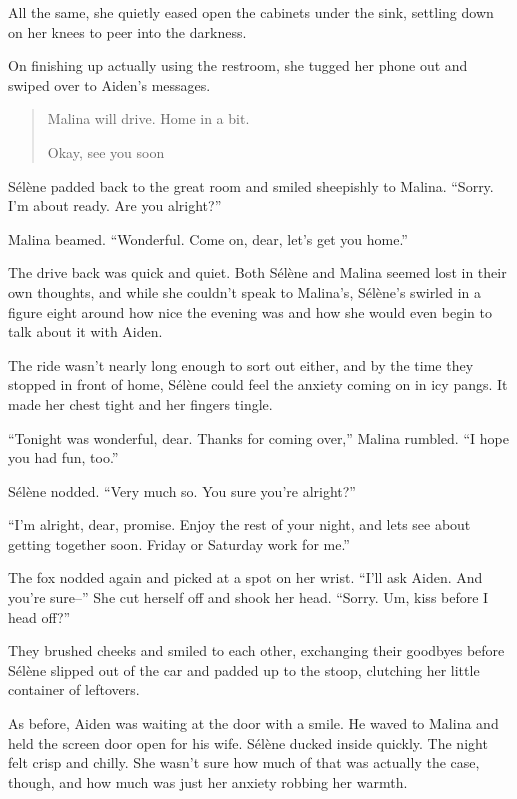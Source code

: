 All the same, she quietly eased open the cabinets under the sink, settling down on her knees to peer into the darkness.

On finishing up actually using the restroom, she tugged her phone out and swiped over to Aiden's messages.

\begin{quote}
 Malina will drive. Home in a bit.

 Okay, see you soon
\end{quote}

Sélène padded back to the great room and smiled sheepishly to Malina. ``Sorry. I'm about ready. Are you alright?''

Malina beamed. ``Wonderful. Come on, dear, let's get you home.''

\secdiv{}

\noindent The drive back was quick and quiet. Both Sélène and Malina seemed lost in their own thoughts, and while she couldn't speak to Malina's, Sélène's swirled in a figure eight around how nice the evening was and how she would even begin to talk about it with Aiden.

The ride wasn't nearly long enough to sort out either, and by the time they stopped in front of home, Sélène could feel the anxiety coming on in icy pangs. It made her chest tight and her fingers tingle.

``Tonight was wonderful, dear. Thanks for coming over,'' Malina rumbled. ``I hope you had fun, too.''

Sélène nodded. ``Very much so. You sure you're alright?''

``I'm alright, dear, promise. Enjoy the rest of your night, and lets see about getting together soon. Friday or Saturday work for me.''

The fox nodded again and picked at a spot on her wrist. ``I'll ask Aiden. And you're sure--'' She cut herself off and shook her head. ``Sorry. Um, kiss before I head off?''

They brushed cheeks and smiled to each other, exchanging their goodbyes before Sélène slipped out of the car and padded up to the stoop, clutching her little container of leftovers.

As before, Aiden was waiting at the door with a smile. He waved to Malina and held the screen door open for his wife. Sélène ducked inside quickly. The night felt crisp and chilly. She wasn't sure how much of that was actually the case, though, and how much was just her anxiety robbing her warmth.


